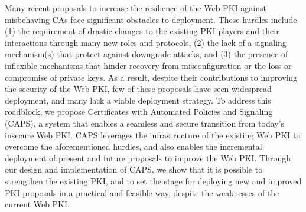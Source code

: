Many recent proposals to increase the resilience of the Web PKI against
misbehaving CAs face significant obstacles to deployment. These hurdles include
(1) the requirement of drastic changes to the existing PKI players and their
interactions through many new roles and protocols, (2) the lack of a signaling
mechanism(s) that protect against downgrade attacks, and (3) the presence of
inflexible mechanisms that hinder recovery from misconfiguration or the loss or
compromise of private keys. As a result, despite their contributions to
improving the security of the Web PKI, few of these proposals have seen
widespread deployment, and many lack a viable deployment strategy. To address
this roadblock, we propose Certificates with Automated Policies and Signaling
(CAPS), a system that enables a seamless and secure transition from today's
insecure Web PKI. CAPS leverages the infrastructure of the existing Web PKI to
overcome the aforementioned hurdles, and also enables the incremental deployment
of present and future proposals to improve the Web PKI. Through our design and
implementation of CAPS, we show that it is possible to strengthen the existing
PKI, and to set the stage for deploying new and improved PKI proposals in a
practical and feasible way, despite the weaknesses of the current Web PKI.
